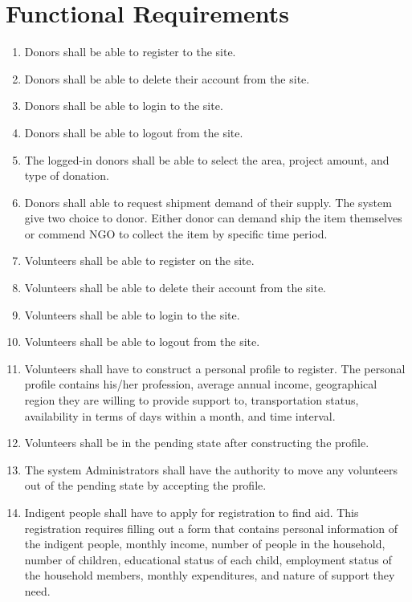 \documentclass[a4paper,12pt]{report}
\begin{document}
	\chapter{Functional Requirements}
	\begin{enumerate}
		\item Donors shall be able to register to the site.
		\item Donors shall be able to delete their account from the site.
		\item Donors shall be able to login to the site.
		\item Donors shall be able to logout from the site.
		\item The logged-in donors shall be able to select the area, project amount, and type of donation.
		
		\item Donors shall able to request shipment demand of their supply. The system give two choice to donor. Either donor can demand ship the item themselves or commend NGO to collect the item by specific time period.

		\item Volunteers shall be able to register on the site.
		
		\item Volunteers shall be able to delete their account from the site.
		\item Volunteers shall be able to login to the site.
		\item Volunteers shall be able to logout from the site.
		
		\item Volunteers shall have to construct a personal profile to register. The personal profile contains his/her profession, average annual income, geographical region they are willing to provide support to, transportation status, availability in terms of days within a month, and time interval.
		
		\item Volunteers shall be in the pending state after constructing the profile.
		
		\item The system Administrators shall have the authority to move any volunteers out of the pending state by accepting the profile.
		
		\item Indigent people shall have to apply for registration to find aid. This registration requires filling out a form that contains personal information of the indigent people, monthly income, number of people in the household, number of children, educational status of each child, employment status of the household members, monthly expenditures, and nature of support they need.
		

\end{enumerate}
\end{document}

